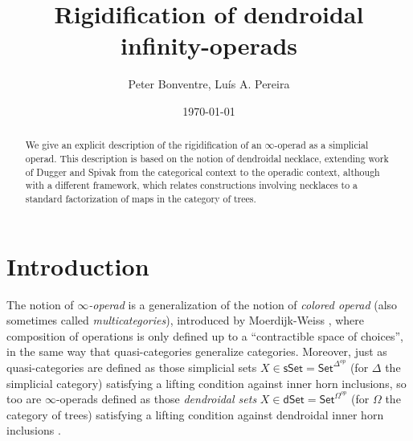 \documentclass[a4paper,10pt
,draft
]{article}%
\title{Rigidification of dendroidal infinity-operads}
\author{Peter Bonventre, Lu\'is A. Pereira}%
\date{\today}
\numberwithin{equation}{section}
\numberwithin{figure}{section}
\theoremstyle{definition} %
\newcommand{\1}{\ensuremath{\mathbbm 1}}%
\begin{document}
\maketitle

\begin{abstract}
	We give an explicit description
	of the rigidification of an $\infty$-operad
	as a simplicial operad.
	This description is based on the notion of 
	dendroidal necklace, 
	extending work of 
	Dugger and Spivak
	from the categorical context to 
	the operadic context,
	although with a different framework,
	which relates constructions involving necklaces 
	to a standard factorization
	of maps in the category of trees.
\end{abstract}

\tableofcontents







\section{Introduction}

The notion of \emph{$\infty$-operad} is a generalization of the notion of \emph{colored operad}
(also sometimes called \emph{multicategories}),
introduced by Moerdijk-Weiss \cite{MW07},
where composition of operations is only defined up to a
``contractible space of choices'',
in the same way that quasi-categories generalize categories.
Moreover, just as quasi-categories are defined as those simplicial sets 
$X \in \mathsf{sSet} = \mathsf{Set}^{\Delta^{op}}$
(for $\Delta$ the simplicial category)
satisfying a lifting condition against inner horn inclusions,
so too are $\infty$-operads defined as those \emph{dendroidal sets}
$X \in \mathsf{dSet} = \mathsf{Set}^{\Omega^{op}}$
(for $\Omega$ the category of trees)
satisfying a lifting condition against 
dendroidal inner horn inclusions \cite[\S 2.1]{CM11}.
\end{document}
